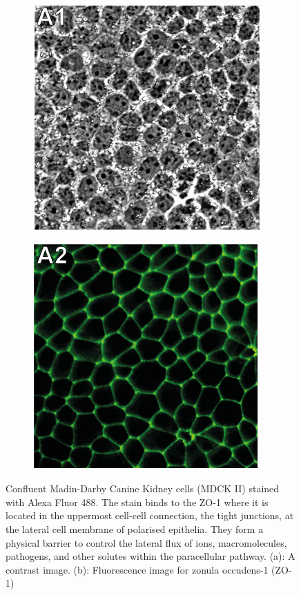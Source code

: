 \documentclass[a4paper]{article}
\begin{document}
\begin{figure}[h]
    \centering
    \begin{subfigure}[b]{0.4\linewidth}
        \includegraphics[width=0.8\linewidth]{Figures/CellPhotoA1.pdf}
        \caption{}
        \label{fig:A1}
    \end{subfigure}
    \begin{subfigure}[b]{0.4\linewidth}
        \includegraphics[width=0.8\linewidth]{Figures/CellPhotoA2.pdf}
        \caption{}
        \label{fig:A2}
    \end{subfigure}
    \caption{Confluent Madin-Darby Canine Kidney cells (MDCK II) stained with Alexa Fluor 488. The stain binds to the ZO-1 where it is located in the uppermost cell-cell connection, the tight junctions, at the lateral cell membrane of polarised epithelia. They form a physical barrier to control the lateral flux of ions, macromolecules, pathogens, and other solutes within the paracellular pathway. (a): A contrast image. (b): Fluorescence image for zonula occudens-1 (ZO-1)}
    \label{fig:HexagonalCells}
\end{figure}
\end{document}
